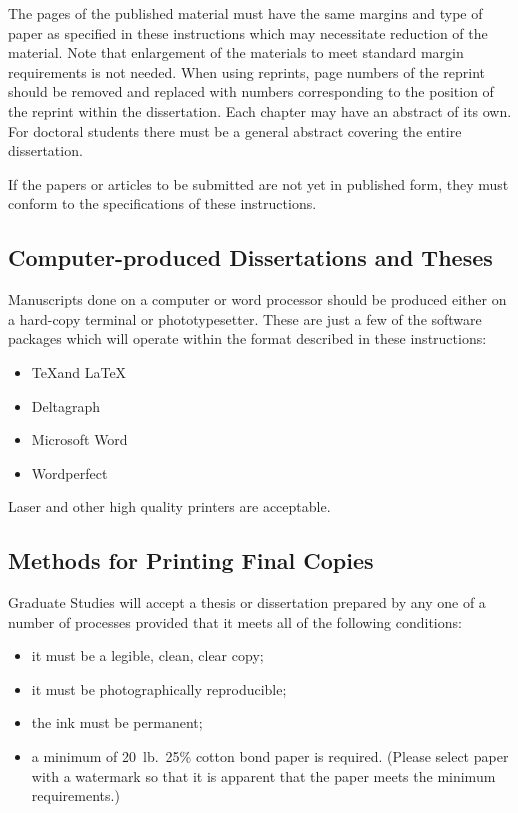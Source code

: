 The pages of the published material must have the same margins and type of paper as specified in these instructions which may necessitate reduction of the material. Note that enlargement of the materials to meet standard margin requirements is not needed. When using reprints, page numbers of the reprint should be removed and replaced with numbers corresponding to the position of the reprint within the dissertation. Each chapter may have an abstract of its own. For doctoral students there must be a general abstract covering the entire dissertation.

If the papers or articles to be submitted are not yet in published form, they must conform to the specifications of these instructions.

\subsection{Computer-produced Dissertations and Theses}
%
Manuscripts done on a computer or word processor should be produced either on a hard-copy terminal or phototypesetter. These are just a few of the software packages which will operate within the format described in these instructions:

\begin{itemize}
  \item \TeX and \LaTeX
  \item Deltagraph
  \item Microsoft Word
  \item Wordperfect
\end{itemize}

Laser and other high quality printers are acceptable.


\subsection{Methods for Printing Final Copies}
%
Graduate Studies will accept a thesis or dissertation prepared by any one of a number of processes provided that it meets all of the following conditions:

\begin{itemize}
  \item it must be a legible, clean, clear copy;
  \item it must be photographically reproducible;
  \item the ink must be permanent;
  \item a minimum of 20~lb.\ 25\% cotton bond paper is required. (Please select paper with a watermark so that it is apparent that the paper meets the minimum requirements.)
\end{itemize}

